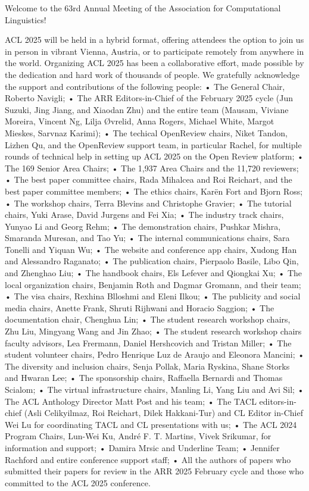 Welcome to the 63rd Annual Meeting of the Association for Computational Linguistics!

ACL 2025 will be held in a hybrid format, offering attendees the option to join us in person in vibrant Vienna, Austria, or to participate remotely from anywhere in the world. Organizing ACL 2025 has been a collaborative effort, made possible by the dedication and hard work of thousands of people. We gratefully acknowledge the support and contributions of the following people:
• The General Chair, Roberto Navigli;
• The ARR Editors-in-Chief of the February 2025 cycle (Jun Suzuki, Jing Jiang, and Xiaodan Zhu) and the entire team (Mausam, Viviane Moreira, Vincent Ng, Lilja Øvrelid, Anna Rogers, Michael White, Margot Mieskes, Sarvnaz Karimi);
• The techical OpenReview chairs, Niket Tandon, Lizhen Qu, and the OpenReview support team, in particular Rachel, for multiple rounds of technical help in setting up ACL 2025 on the Open Review platform;
• The 169 Senior Area Chairs;
• The 1,937 Area Chairs and the 11,720  reviewers; 
• The best paper committee chairs, Rada Mihalcea and Roi Reichart, and the best paper committee members; 
• The ethics chairs, Karën Fort and Bjorn Ross; 
• The workshop chairs, Terra Blevins and Christophe Gravier;
• The tutorial chairs, Yuki Arase, David Jurgens and Fei Xia;
• The industry track chairs, Yunyao Li and Georg Rehm;
• The demonstration chairs, Pushkar Mishra, Smaranda Muresan, and Tao Yu;
• The internal communications chairs, Sara Tonelli and Yiquan Wu;
• The website and conference app chairs, Xudong Han and Alessandro Raganato; 
• The publication chairs, Pierpaolo Basile, Libo Qin, and Zhenghao Liu;
• The handbook chairs, Els Lefever and Qiongkai Xu;
• The local organization chairs, Benjamin Roth and Dagmar Gromann, and their team;
• The visa chairs, Rexhina Blloshmi and Eleni Ilkou;
• The publicity and social media chairs, Anette Frank, Shruti Rijhwani and Horacio Saggion;
• The documentation chair, Chenghua Lin;
• The student research workshop chairs, Zhu Liu, Mingyang Wang and Jin Zhao;
• The student research workshop chairs faculty advisors, Lea Frermann, Daniel Hershcovich               
and Tristan Miller;
• The student volunteer chairs, Pedro Henrique Luz de Araujo and Eleonora Mancini;
• The diversity and inclusion chairs, Senja Pollak, Maria Ryskina, Shane Storks and Hwaran Lee;
• The sponsorship chairs, Raffaella Bernardi and Thomas Scialom;
• The virtual infrastructure chairs, Manling Li, Yang Liu and Avi Sil;
• The ACL Anthology Director Matt Post and his team;
• The TACL editors-in-chief (Asli Celikyilmaz, Roi Reichart, Dilek Hakkani-Tur) and CL Editor in-Chief Wei Lu for coordinating TACL and CL presentations with us;
• The ACL 2024 Program Chairs, Lun-Wei Ku, André F. T. Martins, Vivek Srikumar, for information and support;
• Damira Mrsic and Underline Team; 
• Jennifer Rachford and entire conference support staff; 
• All the authors of papers who submitted their papers for review in the ARR 2025 February cycle and those who committed to the ACL 2025 conference.

